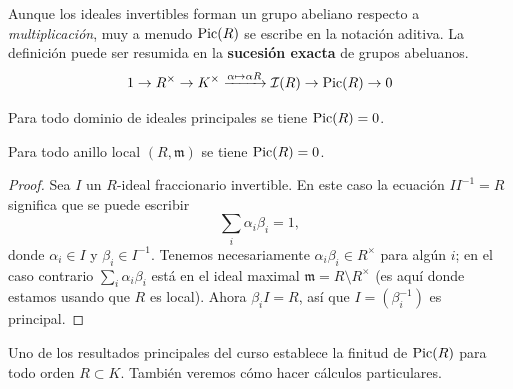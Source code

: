 Aunque los ideales invertibles forman un grupo abeliano respecto
a \emph{multiplicación}, muy a menudo $\operatorname{Pic} (R)$ se escribe en la notación
aditiva. La definición puede ser resumida en la \textbf{sucesión exacta}
de grupos abeluanos.
\[ 1 \to R^\times \to K^\times \xrightarrow{\alpha \mapsto \alpha R}
       \mathcal{I} (R) \to \operatorname{Pic} (R) \to 0 \]

\begin{ejemplo}
  Para todo dominio de ideales principales se tiene $\operatorname{Pic} (R) = 0$.
\end{ejemplo}

\begin{ejemplo}
  Para todo anillo local $(R,\mathfrak{m})$ se tiene $\operatorname{Pic} (R) = 0$.

  \begin{proof}
    Sea $I$ un $R$-ideal fraccionario invertible. En este caso la ecuación
    $I I^{-1} = R$ significa que se puede escribir
    $$\sum_i \alpha_i \beta_i = 1,$$
    donde $\alpha_i \in I$ y $\beta_i \in I^{-1}$. Tenemos necesariamente
    $\alpha_i \beta_i \in R^\times$ para algún $i$; en el caso contrario
    $\sum_i \alpha_i \beta_i$ está en el ideal maximal
    $\mathfrak{m} = R\setminus R^\times$ (es aquí donde estamos usando que $R$
    es local). Ahora $\beta_i I = R$, así que $I = (\beta_i^{-1})$ es principal.
  \end{proof}
\end{ejemplo}

Uno de los resultados principales del curso establece la finitud de $\operatorname{Pic} (R)$
para todo orden $R \subset K$. También veremos cómo hacer cálculos particulares.

